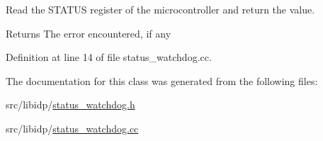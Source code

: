 Read the STATUS register of the microcontroller and return the value. 

\begin{DoxyReturn}{Returns}
The error encountered, if any 
\end{DoxyReturn}


Definition at line 14 of file status\_\-watchdog.cc.



The documentation for this class was generated from the following files:\begin{DoxyCompactItemize}
\item 
src/libidp/\hyperlink{status__watchdog_8h}{status\_\-watchdog.h}\item 
src/libidp/\hyperlink{status__watchdog_8cc}{status\_\-watchdog.cc}\end{DoxyCompactItemize}

